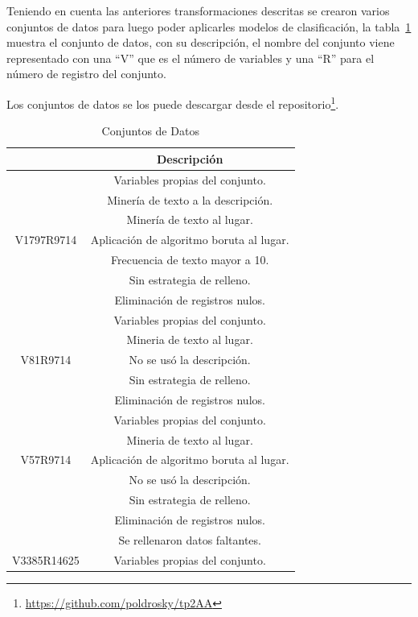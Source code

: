Teniendo en cuenta las anteriores transformaciones descritas se crearon varios conjuntos de 
datos para luego poder aplicarles modelos de clasificación, la tabla~\ref{table:conjunto} muestra
el conjunto de datos, con su descripción, el nombre del conjunto viene representado con una ``V'' que
es el número de variables y una ``R'' para el número de registro del conjunto. 

Los conjuntos de datos se los puede descargar desde el repositorio\footnote{\url{https://github.com/poldrosky/tp2AA}}. 


\begin{table}
\begin{center}
\caption{Conjuntos de Datos}
\label{table:conjunto}
\begin{tabular}{|c|c|}
\hline
  \rowcolor{blue!55} 
   \multicolumn{1}{|c|}{Nombre del conjunto} & \multicolumn{1}{c|}{Descripción} \\ \hline
    & Variables propias del conjunto. \\
        & Minería de texto a la descripción. \\
        & Minería de texto al lugar. \\
   V1797R9714 & Aplicación de algoritmo boruta al lugar. \\
        & Frecuencia de texto mayor a 10. \\ 
        & Sin estrategia de relleno. \\
        & Eliminación de registros nulos. \\ \hline
      &   Variables propias del conjunto.\\
        & Mineria de texto al lugar. \\
   V81R9714 & No se usó la descripción. \\
        & Sin estrategia de relleno. \\
        & Eliminación de registros nulos. \\ \hline
    & Variables propias del conjunto.\\
        & Mineria de texto al lugar. \\
   V57R9714 & Aplicación de algoritmo boruta al lugar. \\
        & No se usó la descripción. \\
        & Sin estrategia de relleno. \\
        & Eliminación de registros nulos. \\ \hline
        & Se rellenaron datos faltantes. \\
   V3385R14625 & Variables propias del conjunto. \\

\end{tabular}
\end{center}
\end{table}
